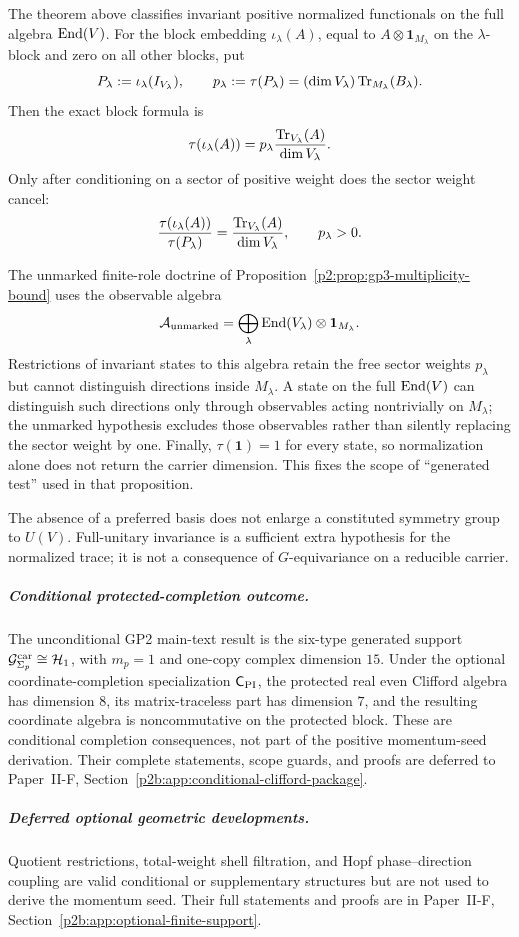 \documentclass[12pt,a4paper]{article}
\begin{document}
\begin{remark}
\label{p2:rem:generated-test-scope}
The theorem above classifies invariant positive normalized functionals on the
full algebra \(\operatorname{End}(V)\).  For the block embedding
\(\iota_\lambda(A)\), equal to
\(A\otimes\mathbf1_{M_\lambda}\) on the \(\lambda\)-block and zero on all
other blocks, put
\[
 P_\lambda:=\iota_\lambda(I_{V_\lambda}),
 \qquad
 p_\lambda:=\tau(P_\lambda)
 =(\dim V_\lambda)\operatorname{Tr}_{M_\lambda}(B_\lambda).
\]
Then the exact block formula is
\[
 \tau\!\left(\iota_\lambda(A)\right)
 =p_\lambda\frac{\operatorname{Tr}_{V_\lambda}(A)}{\dim V_\lambda}.
\]
Only after conditioning on a sector of positive weight does the sector weight
cancel:
\[
 \frac{\tau(\iota_\lambda(A))}{\tau(P_\lambda)}
 =\frac{\operatorname{Tr}_{V_\lambda}(A)}{\dim V_\lambda},
 \qquad p_\lambda>0.
\]

The unmarked finite-role doctrine of
Proposition~\ref{p2:prop:gp3-multiplicity-bound} uses the observable algebra
\[
 \mathcal A_{\rm unmarked}
 =\bigoplus_\lambda
 \operatorname{End}(V_\lambda)\otimes\mathbf1_{M_\lambda}.
\]
Restrictions of invariant states to this algebra retain the free sector
weights \(p_\lambda\) but cannot distinguish directions inside
\(M_\lambda\).  A state on the full \(\operatorname{End}(V)\) can distinguish such
directions only through observables acting nontrivially on \(M_\lambda\); the
unmarked hypothesis excludes those observables rather than silently replacing
the sector weight by one.  Finally, \(\tau(\mathbf1)=1\) for every state, so
normalization alone does not return the carrier dimension.  This fixes the
scope of ``generated test'' used in that proposition.
\end{remark}

\begin{remark}
\label{p2:rem:no-insertion-basis-neutrality}
The absence of a preferred basis does not enlarge a constituted symmetry
group to \(U(V)\).  Full-unitary invariance is a sufficient extra hypothesis
for the normalized trace; it is not a consequence of \(G\)-equivariance on a
reducible carrier.
\end{remark}

\subparagraph{Conditional protected-completion outcome.}
The unconditional GP2 main-text result is the six-type generated support
\(\mathcal G^{\rm car}_{\Sigma_p}\cong\mathcal H_1\), with
\(m_p=1\) and one-copy complex dimension
\(15\).  Under the optional coordinate-completion specialization
\(\mathsf C_{\rm PI}\), the protected real even Clifford algebra has dimension
\(8\), its matrix-traceless part has dimension \(7\), and the resulting
coordinate algebra is noncommutative on the protected block.  These are
conditional completion consequences, not part of the positive momentum-seed
derivation.  Their complete statements, scope guards, and proofs are deferred
to Paper~II-F, Section~\ref{p2b:app:conditional-clifford-package}.
\subparagraph{Deferred optional geometric developments.}
Quotient restrictions, total-weight shell filtration, and Hopf
phase--direction coupling are valid conditional or supplementary structures
but are not used to derive the momentum seed.  Their full statements and
proofs are in Paper~II-F, Section~\ref{p2b:app:optional-finite-support}.
\end{document}
